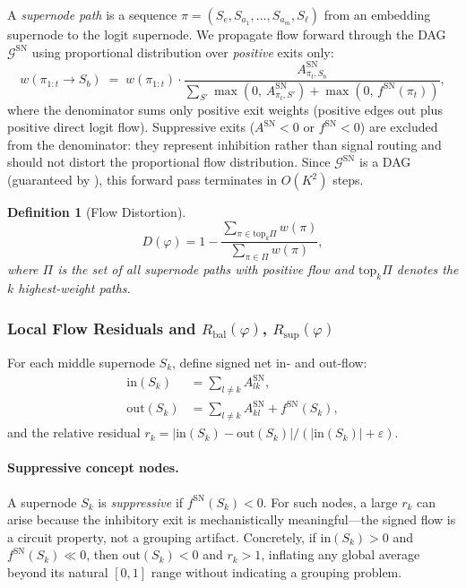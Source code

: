 \documentclass[11pt]{article}
\newtheorem{definition}[theorem]{Definition}
\newcommand{\cG}{\mathcal{G}}
\newcommand{\1}{\mathbbm{1}}
\newcommand{\eps}{\varepsilon}
\newcommand{\Rbal}{R_{\mathrm{bal}}(\varphi)}
\newcommand{\Rsup}{R_{\mathrm{sup}}(\varphi)}
\begin{document}
A \emph{supernode path} is a sequence $\pi = (S_{e}, S_{a_1}, \ldots, S_{a_m}, S_{\ell})$ from an embedding supernode to the logit supernode.
We propagate flow forward through the DAG $\cG^{\mathrm{SN}}$ using proportional distribution over \emph{positive} exits only:
\begin{equation}
  w(\pi_{1:t} \to S_b) \;=\; w(\pi_{1:t}) \cdot \frac{A^{\mathrm{SN}}_{\pi_t, S_b}}{\displaystyle\sum_{S'} \max(0,\, A^{\mathrm{SN}}_{\pi_t, S'}) + \max(0,\, f^{\mathrm{SN}}(\pi_t))},
  \label{eq:flow-prop}
\end{equation}
where the denominator sums only positive exit weights (positive edges out plus positive direct logit flow).
Suppressive exits ($A^{\mathrm{SN}} < 0$ or $f^{\mathrm{SN}} < 0$) are excluded from the denominator: they represent inhibition rather than signal routing and should not distort the proportional flow distribution.
Since $\cG^{\mathrm{SN}}$ is a DAG (guaranteed by ), this forward pass terminates in $O(K^2)$ steps.

\begin{definition}[Flow Distortion]
  \begin{equation}
    D(\varphi) = 1 - \frac{\sum_{\pi \in \mathrm{top}_k \Pi} w(\pi)}{\sum_{\pi \in \Pi} w(\pi)},
    \label{eq:D-phi}
  \end{equation}
  where $\Pi$ is the set of all supernode paths with positive flow and $\mathrm{top}_k \Pi$ denotes the $k$ highest-weight paths.
\end{definition}

\subsubsection{Local Flow Residuals and $\Rbal$, $\Rsup$}
\label{sec:residuals}

For each middle supernode $S_k$, define signed net in- and out-flow:
\begin{align}
  \mathrm{in}(S_k) &= \sum_{l \ne k} A^{\mathrm{SN}}_{lk}, \label{eq:inflow} \\
  \mathrm{out}(S_k) &= \sum_{l \ne k} A^{\mathrm{SN}}_{kl} + f^{\mathrm{SN}}(S_k), \label{eq:outflow}
\end{align}
and the relative residual $r_k = |\mathrm{in}(S_k) - \mathrm{out}(S_k)| / (|\mathrm{in}(S_k)| + \eps)$.

\paragraph{Suppressive concept nodes.}
A supernode $S_k$ is \emph{suppressive} if $f^{\mathrm{SN}}(S_k) < 0$.
For such nodes, a large $r_k$ can arise because the inhibitory exit is mechanistically meaningful---the signed flow is a circuit property, not a grouping artifact.
Concretely, if $\mathrm{in}(S_k) > 0$ and $f^{\mathrm{SN}}(S_k) \ll 0$, then $\mathrm{out}(S_k) < 0$ and $r_k > 1$, inflating any global average beyond its natural $[0,1]$ range without indicating a grouping problem.
\end{document}
